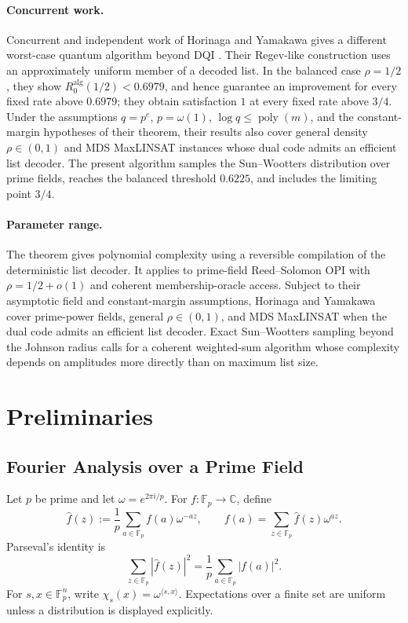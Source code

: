 \documentclass[11pt,letterpaper]{article}
\theoremstyle{definition}
\newcommand{\F}{\mathbb{F}}
\newcommand{\poly}{\operatorname{poly}}
\newcommand{\abs}[1]{\left\lvert #1\right\rvert}
\begin{document}
\paragraph{Concurrent work.}
Concurrent and independent work of Horinaga and Yamakawa gives a different worst-case quantum algorithm beyond DQI \cite{HorinagaYamakawa2026}.  Their Regev-like construction uses an approximately uniform member of a decoded list.  In the balanced case $\rho=1/2$, they show $R_0^{\mathrm{alg}}(1/2)<0.6979$, and hence guarantee an improvement for every fixed rate above $0.6979$; they obtain satisfaction $1$ at every fixed rate above $3/4$.  Under the assumptions $q=p^e$, $p=\omega(1)$, $\log q\le\poly(m)$, and the constant-margin hypotheses of their theorem, their results also cover general density $\rho\in(0,1)$ and MDS MaxLINSAT instances whose dual code admits an efficient list decoder.  The present algorithm samples the Sun--Wootters distribution over prime fields, reaches the balanced threshold $0.6225$, and includes the limiting point $3/4$.

\paragraph{Parameter range.}
The theorem gives polynomial complexity using a reversible compilation of the deterministic list decoder.  It applies to prime-field Reed--Solomon OPI with $\rho=1/2+o(1)$ and coherent membership-oracle access.  Subject to their asymptotic field and constant-margin assumptions, Horinaga and Yamakawa cover prime-power fields, general $\rho\in(0,1)$, and MDS MaxLINSAT when the dual code admits an efficient list decoder.  Exact Sun--Wootters sampling beyond the Johnson radius calls for a coherent weighted-sum algorithm whose complexity depends on amplitudes more directly than on maximum list size.

\section{Preliminaries}

\subsection{Fourier Analysis over a Prime Field}

Let $p$ be prime and let $\omega=e^{2\pi i/p}$.  For $f:\F_p\to\mathbb C$, define
\begin{equation}
   \widehat f(z):=\frac1p\sum_{a\in\F_p} f(a)\omega^{-az},
   \qquad
   f(a)=\sum_{z\in\F_p}\widehat f(z)\omega^{az}.
   \label{eq:fourier-convention}
\end{equation}
Parseval's identity is
\begin{equation}
   \sum_{z\in\F_p}\abs{\widehat f(z)}^2
   =\frac1p\sum_{a\in\F_p}\abs{f(a)}^2.
   \label{eq:parseval-one-dimensional}
\end{equation}
For $s,x\in\F_p^n$, write $\chi_s(x)=\omega^{\langle s,x\rangle}$.  Expectations over a finite set are uniform unless a distribution is displayed explicitly.
\end{document}
